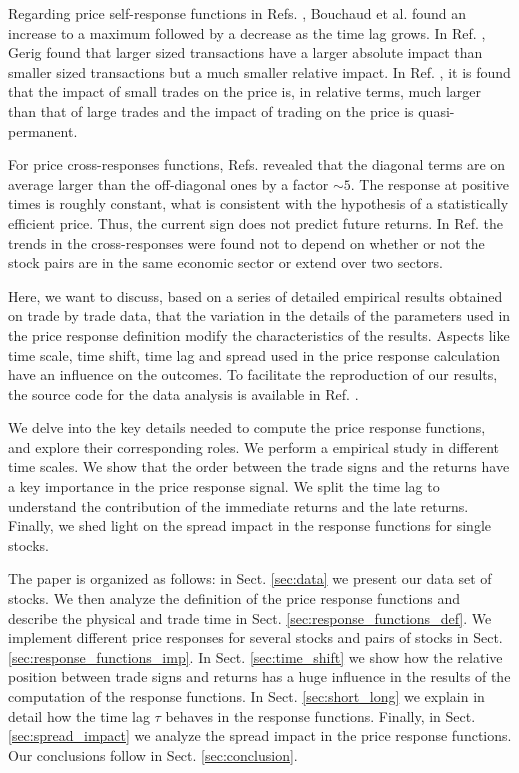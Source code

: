 Regarding price self-response functions in Refs.
\cite{r_walks_liquidity,subtle_nature,Bouchaud_2004}, Bouchaud et al. found an
increase to a maximum followed by a decrease as the time lag grows.
In Ref. \cite{theory_market_impact}, Gerig found that larger sized transactions
have a larger absolute impact than smaller sized transactions but a much
smaller relative impact. In Ref. \cite{prop_order_book}, it is found that the
impact of small trades on the price is, in relative terms, much larger than
that of large trades and the impact of trading on the price is quasi-permanent.

For price cross-responses functions, Refs.
\cite{dissecting_cross,Wang_2016_cross} revealed that the diagonal terms are on
average larger than the off-diagonal ones by a factor $\sim 5$. The response at
positive times is roughly constant, what is consistent with the hypothesis of a
statistically efficient price. Thus, the current sign does not predict future
returns. In Ref. \cite{Wang_2016_cross} the trends in the cross-responses were
found not to depend on whether or not the stock pairs are in the same economic
sector or extend over two sectors.

Here, we want to discuss, based on a series of detailed empirical results
obtained on trade by trade data, that the variation in the details of the
parameters used in the price response definition modify the characteristics of
the results. Aspects like time scale, time shift, time lag and spread used in
the price response calculation have an influence on the outcomes. To facilitate
the reproduction of our results, the source code for the data analysis is
available in Ref. \cite{code}.

We delve into the key details needed to compute the price response functions,
and explore their corresponding roles. We perform a empirical study in
different time scales. We show that the order between the trade signs and
the returns have a key importance in the price response signal. We split the
time lag to understand the contribution of the immediate returns and the late
returns. Finally, we shed light on the spread impact in the response functions
for single stocks.

The paper is organized as follows: in Sect. \ref{sec:data} we present our data
set of stocks. We then analyze the definition of the price response functions
and describe the physical and trade time in Sect.
\ref{sec:response_functions_def}. We implement different price responses for
several stocks and pairs of stocks in Sect. \ref{sec:response_functions_imp}.
In Sect. \ref{sec:time_shift} we show how the relative position between trade
signs and returns has a huge influence in the results of the computation of the
response functions. In Sect. \ref{sec:short_long} we explain in detail how the
time lag $\tau$ behaves in the response functions. Finally, in Sect.
\ref{sec:spread_impact} we analyze the spread impact in the price response
functions. Our conclusions follow in Sect. \ref{sec:conclusion}.
